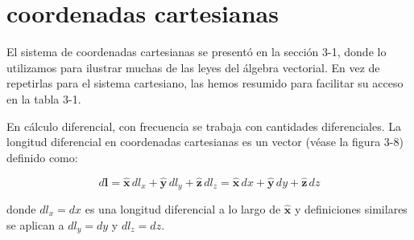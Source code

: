 \section{coordenadas cartesianas}
El sistema de coordenadas cartesianas se presentó en la sección 3-1, donde lo utilizamos para ilustrar muchas de las leyes del álgebra vectorial. En vez de repetirlas para el sistema cartesiano, las hemos resumido para facilitar su acceso en la tabla 3-1. 

En cálculo diferencial, con frecuencia se trabaja con cantidades diferenciales. La longitud diferencial en coordenadas cartesianas es un vector (véase la figura 3-8) definido como:

\begin{equation}
    d\mathbf{l} = \hat{\mathbf{x}}\,dl_x + \hat{\mathbf{y}}\,dl_y + \hat{\mathbf{z}}\,dl_z = \hat{\mathbf{x}}\,dx + \hat{\mathbf{y}}\,dy + \hat{\mathbf{z}}\,dz
    \label{eq:3.34}
\end{equation}

donde $dl_x = dx$ es una longitud diferencial a lo largo de $\hat{\mathbf{x}}$ y definiciones similares se aplican a $dl_y = dy$ y $dl_z = dz$.

